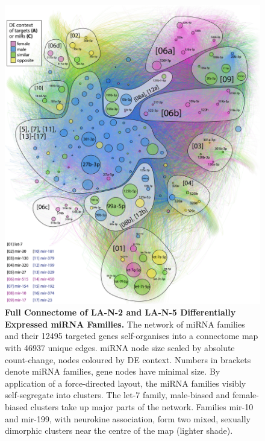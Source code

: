 \begin{figure}
\includegraphics[width=\textwidth]{figures/bignet}
\caption[LA-N-2 / LA-N-5 Full Connectome.]{\textbf{Full Connectome of LA-N-2 and LA-N-5 Differentially Expressed miRNA Families.} The network of miRNA families and their \num{12495} targeted genes self-organises into a connectome map with \num{46937} unique edges. miRNA node size scaled by absolute count-change, nodes coloured by DE context. Numbers in brackets denote miRNA families, gene nodes have minimal size. By application of a force-directed layout, the miRNA families visibly self-segregate into clusters. The let-7 family, male-biased and female-biased clusters take up major parts of the network. Families mir-10 and mir-199, with neurokine association, form two mixed, sexually dimorphic clusters near the centre of the map (lighter shade).
\label{fig:bignet}}
\end{figure}

